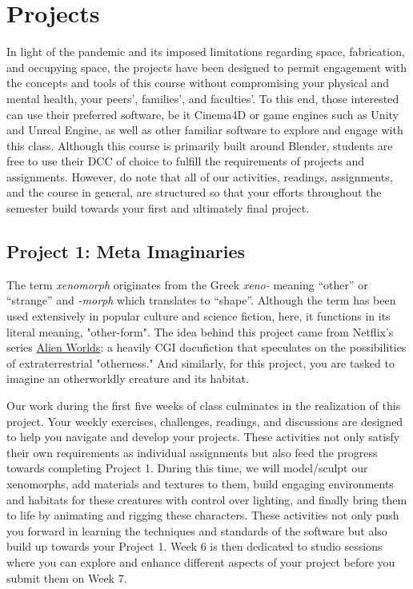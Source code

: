 \section{Projects}

In light of the pandemic and its imposed limitations regarding space, fabrication, and occupying space, the projects have been designed to permit engagement with the concepts and tools of this course without compromising your physical and mental health, your peers', families', and faculties'. To this end, those interested can use their preferred software, be it Cinema4D or game engines such as Unity and Unreal Engine, as well as other familiar software to explore and engage with this class. Although this course is primarily built around Blender, students are free to use their DCC of choice to fulfill the requirements of projects and assignments. However, do note that all of our activities, readings, assignments, and the course in general, are structured so that your efforts throughout the semester build towards your first and ultimately final project.

\subsection{Project 1: Meta Imaginaries}
The term \emph{xenomorph} originates from the Greek \emph{xeno-} meaning ``other'' or ``strange'' and \emph{-morph} which translates to ``shape''. Although the term has been used extensively in popular culture and science fiction, here, it functions in its literal meaning, "other-form". The idea behind this project came from Netflix's series \href{https://en.wikipedia.org/wiki/Alien_Worlds_(TV_series)}{Alien Worlds}: a heavily CGI docufiction that speculates on the possibilities of extraterrestrial "otherness." And similarly, for this project, you are tasked to imagine an otherworldly creature and its habitat.

Our work during the first five weeks of class culminates in the realization of this project. Your weekly exercises, challenges, readings, and discussions are designed to help you navigate and develop your projects. These activities not only satisfy their own requirements as individual assignments but also feed the progress towards completing Project 1. During this time, we will model/sculpt our xenomorphs, add materials and textures to them, build engaging environments and habitats for these creatures with control over lighting, and finally bring them to life by animating and rigging these characters. These activities not only push you forward in learning the techniques and standards of the software but also build up towards your Project 1. Week 6 is then dedicated to studio sessions where you can explore and enhance different aspects of your project before you submit them on Week 7.

